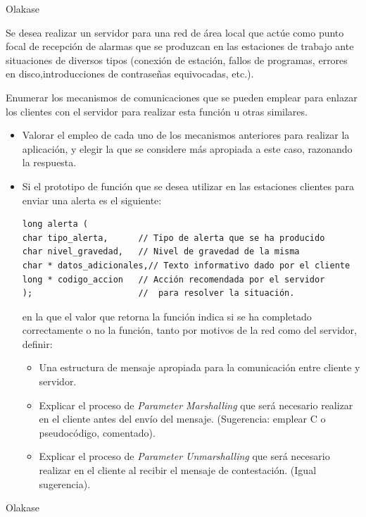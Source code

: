 \begin{problem}[12]
\begin{itemize}
\end{itemize}

\solution


Olakase

\end{problem}

      
  \begin{problem}[13]
  Se desea realizar un servidor para una red de área local que actúe como
punto focal de recepción de alarmas que se produzcan en las estaciones de
trabajo ante situaciones de diversos tipos (conexión de estación, fallos de
programas, errores en disco,introducciones de contraseñas equivocadas, etc.).

    Enumerar los mecanismos de comunicaciones que se pueden emplear para
enlazar los clientes con el servidor para realizar esta función u otras
similares.
\begin{itemize}
    \item Valorar el empleo de cada uno de los mecanismos anteriores para realizar la
aplicación, y elegir la que se considere más apropiada a este caso, razonando
la respuesta.
    \item Si el prototipo de función que se desea utilizar en las estaciones clientes
para enviar una alerta es el siguiente:
    \begin{verbatim}
long alerta (
char tipo_alerta,      // Tipo de alerta que se ha producido
char nivel_gravedad,   // Nivel de gravedad de la misma
char * datos_adicionales,// Texto informativo dado por el cliente
long * codigo_accion   // Acción recomendada por el servidor
);                     //  para resolver la situación.
\end{verbatim}
    en la que el valor que retorna la función indica si se ha completado
correctamente o no la función, tanto por motivos de la red como del servidor,
definir:
    \begin{itemize}
      \item Una estructura de mensaje apropiada para la comunicación entre cliente y
servidor.
      \item Explicar el proceso de \textit{Parameter Marshalling} que será necesario
realizar en el cliente antes del envío del mensaje. (Sugerencia: emplear C o
pseudocódigo, comentado).
      \item Explicar el proceso de \textit{Parameter Unmarshalling} que será necesario
realizar en el cliente al recibir el mensaje de contestación. (Igual sugerencia).
    \end{itemize}
    \end{itemize}
      \solution

      Olakase

      \end{problem}

